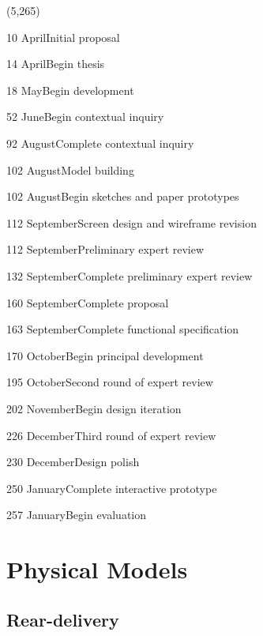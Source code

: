 \documentclass[11pt]{article}
\begin{document}
\begin{timeline}{4.2in}(5,265)
\optrule
  \item[10]{April}{Initial proposal}
  \item[14]{April}{Begin thesis}
  \item[18]{May}{Begin development}
  \item[52]{June}{Begin contextual inquiry}
  \item[92]{August}{Complete contextual inquiry}
  \item[102]{August}{Model building}
  \item[102]{August}{Begin sketches and paper prototypes}
  \item[112]{September}{Screen design and wireframe revision}
  \item[112]{September}{Preliminary expert review}
  \item[132]{September}{Complete preliminary expert review}
  \item[160]{September}{Complete proposal}
  \item[163]{September}{Complete functional specification}
  \item[170]{October}{Begin principal development}
  \item[195]{October}{Second round of expert review}
  \item[202]{November}{Begin design iteration}
  \item[226]{December}{Third round of expert review}
  \item[230]{December}{Design polish}
  \item[250]{January}{Complete interactive prototype}
  \item[257]{January}{Begin evaluation}
\end{timeline}%
\newpage

\footnotesize{
}
\newpage

\appendix
\renewcommand\thesection{Appendix \Alph{section}}

\section{Physical Models}
\subsection{Rear-delivery}
\end{document}
